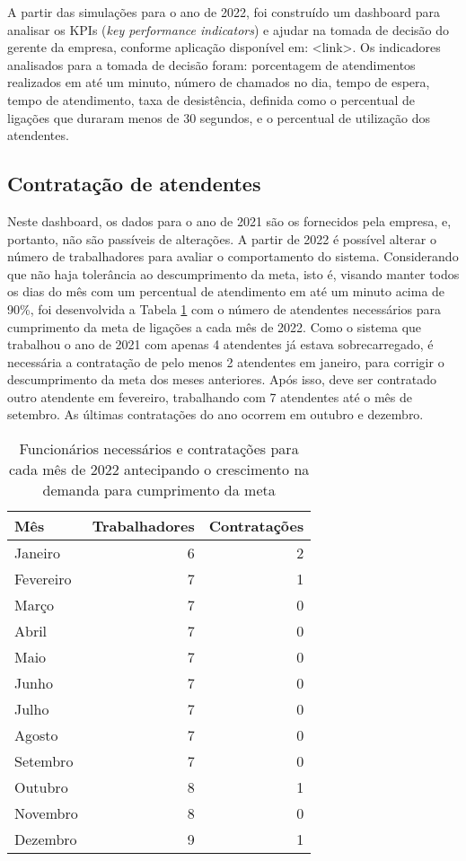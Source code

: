 A partir das simulações para o ano de 2022, foi construído um dashboard para analisar os KPIs (\textit{key performance indicators}) e ajudar na tomada de decisão do gerente da empresa, conforme aplicação disponível em: <link>. Os indicadores analisados para a tomada de decisão foram: porcentagem de atendimentos realizados em até um minuto, número de chamados no dia, tempo de espera, tempo de atendimento, taxa de desistência, definida como o percentual de ligações que duraram menos de 30 segundos, e o percentual de utilização dos atendentes.

\subsection{Contratação de atendentes}
Neste dashboard, os dados para o ano de 2021 são os fornecidos pela empresa, e, portanto, não são passíveis de alterações. A partir de 2022 é possível alterar o número de trabalhadores para avaliar o comportamento do sistema. Considerando que não haja tolerância ao descumprimento da meta, isto é, visando manter todos os dias do mês com um percentual de atendimento em até um minuto acima de 90\%, foi desenvolvida a Tabela \ref*{tab: funcionarios-2022} com o número de atendentes necessários para cumprimento da meta de ligações a cada mês de 2022. Como o sistema que trabalhou o ano de 2021 com apenas 4 atendentes já estava sobrecarregado, é necessária a contratação de pelo menos 2 atendentes em janeiro, para corrigir o descumprimento da meta dos meses anteriores. Após isso, deve ser contratado outro atendente em fevereiro, trabalhando com 7 atendentes até o mês de setembro. As últimas contratações do ano ocorrem em outubro e dezembro.

\begin{table}[H]
    \centering
    \begin{tabular}{|l|r|r|}
    \hline
    \textbf{Mês} & \multicolumn{1}{l|}{\textbf{Trabalhadores}} & \multicolumn{1}{l|}{\textbf{Contratações}} \\ \hline
    Janeiro & 6 & 2 \\ \hline
    Fevereiro & 7 & 1 \\ \hline
    Março & 7 & 0 \\ \hline
    Abril & 7 & 0 \\ \hline
    Maio & 7 & 0 \\ \hline
    Junho & 7 & 0 \\ \hline
    Julho  & 7 & 0 \\ \hline
    Agosto & 7 & 0 \\ \hline
    Setembro & 7 & 0 \\ \hline
    Outubro & 8 & 1 \\ \hline
    Novembro & 8 & 0 \\ \hline
    Dezembro & 9 & 1 \\ \hline
    \end{tabular}
    \caption{Funcionários necessários e contratações para cada mês de 2022 antecipando o crescimento na demanda para cumprimento da meta}
    \label{tab: funcionarios-2022}
    \end{table}
    

